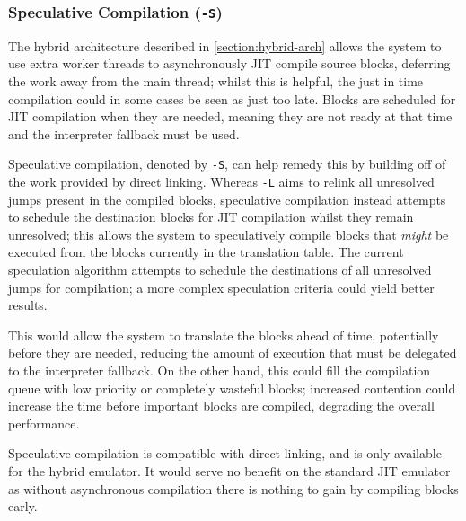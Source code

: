 \subsubsection{Speculative Compilation (\texttt{-S})}

The hybrid architecture described in \autoref{section:hybrid-arch} allows the system to use extra worker threads to asynchronously JIT compile source blocks, deferring the work away from the main thread; whilst this is helpful, the just in time compilation could in some cases be seen as just too late. Blocks are scheduled for JIT compilation when they are needed, meaning they are not ready at that time and the interpreter fallback must be used.

Speculative compilation, denoted by \texttt{-S}, can help remedy this by building off of the work provided by direct linking. Whereas \texttt{-L} aims to relink all unresolved jumps present in the compiled blocks, speculative compilation instead attempts to schedule the destination blocks for JIT compilation whilst they remain unresolved; this allows the system to speculatively compile blocks that \textit{might} be executed from the blocks currently in the translation table. The current speculation algorithm attempts to schedule the destinations of all unresolved jumps for compilation; a more complex speculation criteria could yield better results.

This would allow the system to translate the blocks ahead of time, potentially before they are needed, reducing the amount of execution that must be delegated to the interpreter fallback. On the other hand, this could fill the compilation queue with low priority or completely wasteful blocks; increased contention could increase the time before important blocks are compiled, degrading the overall performance.

Speculative compilation is compatible with direct linking, and is only available for the hybrid emulator. It would serve no benefit on the standard JIT emulator as without asynchronous compilation there is nothing to gain by compiling blocks early.